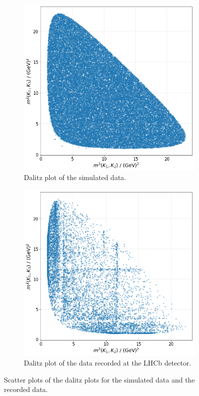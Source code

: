 \begin{figure}
  \centering
  \begin{subfigure}[b]{0.45\textwidth}
      \centering
      \includegraphics[width=\textwidth]{"content/pics/Dalitz_sim.png"}
      \caption{Dalitz plot of the simulated data.}
      \label{fig:dalitz_sim}
  \end{subfigure}
  \hfill
  \begin{subfigure}[b]{0.45\textwidth}
      \centering
      \includegraphics[width=\textwidth]{"content/pics/Dalitz_real.png"}
      \caption{Dalitz plot of the data recorded at the LHCb detector.}
      \label{fig:dalitz_real}
  \end{subfigure}
     \caption{Scatter plots of the dalitz plots for the simulated data and the recorded data.}
\end{figure}

